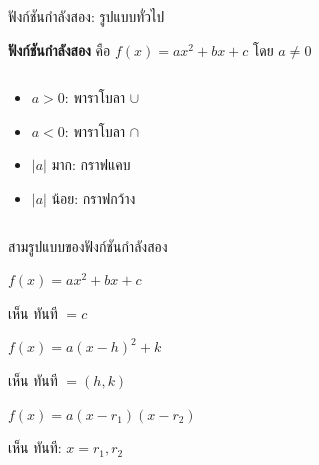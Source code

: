 \documentclass[11pt, aspectratio=169]{beamer}
\begin{document}
\begin{frame}{ฟังก์ชันกำลังสอง: รูปแบบทั่วไป}
  \begin{explanation}[นิยาม]
    \textbf{ฟังก์ชันกำลังสอง} คือ $f(x) = ax^2 + bx + c$ โดย $a \neq 0$
  \end{explanation}

  \begin{columns}[T]
      \begin{explanation}[รูปร่างของกราฟ]
        \begin{itemize}
          \item $a > 0$: พาราโบลา  $\cup$
          \item $a < 0$: พาราโบลา  $\cap$
          \item $|a|$ มาก: กราฟแคบ
          \item $|a|$ น้อย: กราฟกว้าง
        \end{itemize}
      \end{explanation}
      \centering
  \end{columns}
\end{frame}

\begin{frame}{สามรูปแบบของฟังก์ชันกำลังสอง}
  \begin{explanation}
    $f(x) = ax^2 + bx + c$

    เห็น  ทันที $= c$
  \end{explanation}

  \begin{explanation}
    $f(x) = a(x - h)^2 + k$

    เห็น  ทันที $= (h, k)$
  \end{explanation}

  \begin{explanation}
    $f(x) = a(x - r_1)(x - r_2)$

    เห็น  ทันที: $x = r_1, r_2$
  \end{explanation}
\end{frame}
\end{document}
